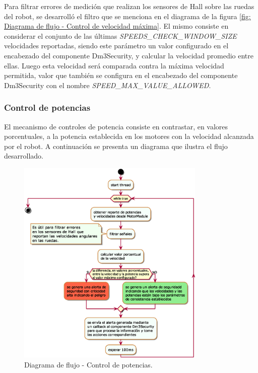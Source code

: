 \documentclass[withindex,glossary]{cam-thesis}
\begin{document}
Para filtrar errores de medición que realizan los sensores de Hall \cite{MPC4728} sobre las ruedas del robot, se desarrolló el filtro que se menciona en el diagrama de la figura \ref{fig: Diagrama de flujo - Control de velocidad máxima}. El mismo consiste en considerar el conjunto de las últimas \textit{SPEEDS\_CHECK\_WINDOW\_SIZE} velocidades reportadas, siendo este parámetro un valor configurado en el encabezado del componente Dm3Security, y calcular la velocidad promedio entre ellas. Luego esta velocidad será comparada contra la máxima velocidad permitida, valor que también se configura en el encabezado del componente Dm3Security con el nombre \textit{SPEED\_MAX\_VALUE\_ALLOWED}.

\subsubsection{Control de potencias}
El mecanismo de controles de potencia consiste en contrastar, en valores porcentuales, a la potencia establecida en los motores con la velocidad alcanzada por el robot. A continuación se presenta un diagrama que ilustra el flujo desarrollado.

\begin{figure}[H]
\centering
\includegraphics[width=0.8\textwidth]{images/Diagrama_de_flujo_Dm3Security_Pows}
\caption[Diagrama de flujo - Control de potencias]{Diagrama de flujo - Control de potencias.}
\label{fig: Diagrama de flujo - Control de potencias}
\end{figure}
\end{document}
